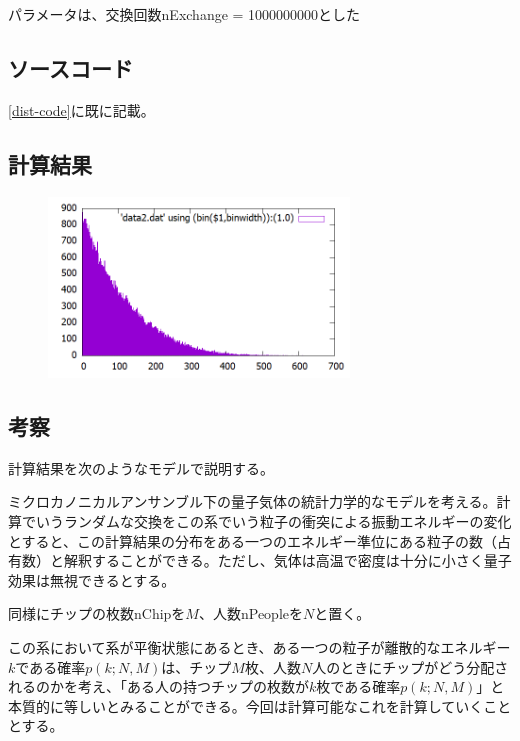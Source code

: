 \documentclass[ %
  platex,%
  papersize,%
  twocolumn,
  landscape
]{jsarticle}
\begin{document}
パラメータは、交換回数nExchange = 1000000000とした\\

\subsection{ソースコード}
\ref{dist-code}に既に記載。

\subsection{計算結果}
\begin{figure}[H]
\begin{center}
\includegraphics[width=8cm]{../cpp/out/dice_game/data2.png}
\end{center}
\caption{}
\end{figure}

\subsection{考察}
計算結果を次のようなモデルで説明する。

ミクロカノニカルアンサンブル下の量子気体の統計力学的なモデルを考える。計算でいうランダムな交換をこの系でいう粒子の衝突による振動エネルギーの変化とすると、この計算結果の分布をある一つのエネルギー準位にある粒子の数（占有数）と解釈することができる。ただし、気体は高温で密度は十分に小さく量子効果は無視できるとする。

同様にチップの枚数nChipを$M$、人数nPeopleを$N$と置く。

この系において系が平衡状態にあるとき、ある一つの粒子が離散的なエネルギー$k$である確率$p(k;N,M)$は、チップ$M$枚、人数$N$人のときにチップがどう分配されるのかを考え、「ある人の持つチップの枚数が$k$枚である確率$p(k;N,M)$」と本質的に等しいとみることができる。今回は計算可能なこれを計算していくこととする。
\end{document}
